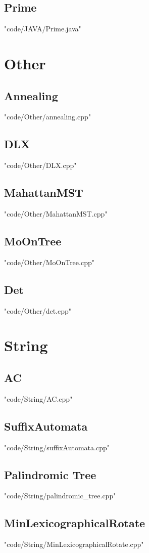 \documentclass [8pt,a4paper,twocolumn]{article}
\begin{document}
\subsection{Prime}
 {"code/JAVA/Prime.java"}
\section{Other}
\subsection{Annealing}
 {"code/Other/annealing.cpp"}
\subsection{DLX}
 {"code/Other/DLX.cpp"}
\subsection{MahattanMST}
 {"code/Other/MahattanMST.cpp"}
\subsection{MoOnTree}
 {"code/Other/MoOnTree.cpp"}
\subsection{Det}
 {"code/Other/det.cpp"}
\section{String}
\subsection{AC}
 {"code/String/AC.cpp"}
\subsection{SuffixAutomata}
 {"code/String/suffixAutomata.cpp"}
\subsection{Palindromic Tree}
 {"code/String/palindromic_tree.cpp"}
\subsection{MinLexicographicalRotate}
 {"code/String/MinLexicographicalRotate.cpp"}
\end{document}
